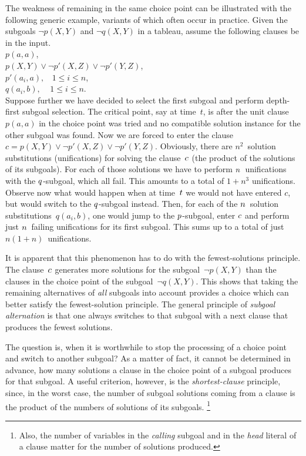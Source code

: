 The weakness of remaining in the same choice point can be illustrated
with the following generic example, variants of which often occur in
practice. 
Given the subgoals $\neg p(X,Y)$ and $\neg q(X,Y)$ in a tableau,
assume the following clauses be in the input.\\[1ex] 
%
\hspace*{10ex}%
$p(a,a)$, \\
\hspace*{10ex}%
$p(X,Y) \vee \neg p'(X,Z) \vee \neg p'(Y,Z)$,\\
\hspace*{10ex}%
$p'(a_i,a), \ \ \ \ 1 \leq i \leq n$, \\
\hspace*{10ex}%
$q(a_i,b), \ \ \ \ \  1 \leq i \leq n$.\\[1ex]
%
Suppose further we have decided to select the first subgoal and
perform  depth-first subgoal selection.
The critical point, say at time~$t$, is after the unit clause~$p(a,a)$
in the choice point was tried and no compatible solution instance for
the other subgoal was found.
Now we are forced to enter the clause 
$c = p(X,Y) \vee \neg p'(X,Z) \vee \neg p'(Y,Z)$.
Obviously, there are $n^2$~solution substitutions (unifications) for
solving the clause~$c\/$ (the product of the solutions of its subgoals). 
For each of those solutions we have to perform $n\/$~unifications with
the $q\/$-subgoal, which all fail.  
This amounts to a total of $1 + n^3$ unifications.
Observe now what would happen when at time~$t\/$ we would not have
entered $c$, but would switch to the $q\/$-subgoal instead.  
Then, for each of the $n\/$~solution substitutions~$q(a_i,b)$, one
would jump to the $p\/$-subgoal, enter $c\/$ and perform just
$n\/$~failing unifications for its first subgoal.  
This sums up to a total of just $n (1 + n)$~unifications. 

It is apparent that this phenomenon has to do with the
fewest-solutions principle.
The clause~$c\/$ generates more solutions for the subgoal~$\neg
p(X,Y)$ than the clauses in the choice point of the subgoal~$\neg
q(X,Y)$.  
This shows that taking the remaining alternatives of {\em all\/}
subgoals into account provides a choice which can better satisfy the
fewest-solution principle. 
The general principle of {\em subgoal alternation\/} is that one
always switches to that subgoal with a next clause that produces the
fewest solutions. 

The question is, when it is worthwhile to stop the processing of a
choice point and switch to another subgoal?
As a matter of fact, it cannot be determined in advance, how many
solutions a clause in the choice point of a subgoal produces for that
subgoal.  
A useful criterion, however, is the {\em shortest-clause\/} principle,
since, in the worst case, the number of subgoal solutions coming from
a clause is the product of the numbers of solutions of its subgoals.%
\footnote{Also, the number of variables in the {\em calling\/} subgoal
	and in the {\em head\/} literal of a clause matter for the
	number of solutions produced.} 

